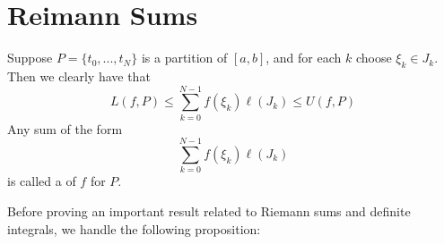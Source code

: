 \section{Reimann Sums}

\begin{definition}
    Suppose $P = \{t_0,...,t_N\}$ is a partition of $[a,b]$, and for each $k$ choose $\xi_k \in J_k$. Then we clearly have that \begin{equation}
        L(f,P) \leq \sum\limits_{k=0}^{N-1}f(\xi_k)\ell(J_k) \leq U(f,P)
    \end{equation}
    Any sum of the form \begin{equation}
        \sum\limits_{k=0}^{N-1}f(\xi_k)\ell(J_k)
    \end{equation}
    is called a  of $f$ for $P$.
\end{definition}


Before proving an important result related to Riemann sums and definite integrals, we handle the following proposition:

